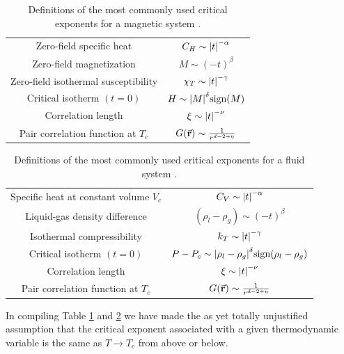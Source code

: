 \documentclass[../main/main.tex]{subfiles}
\begin{document}
\begin{table}[h!]
  \begin{center}
\begin{tabular}{cc}
\toprule
 Zero-field specific heat & \( C_H \sim \abs{t}^{-\alpha }  \) \\
 Zero-field magnetization & \( M \sim (-t)^{\beta } \) \\
 Zero-field isothermal susceptibility & \( \chi _T \sim \abs{t}^{-\gamma  }  \) \\
 Critical isotherm \( (t=0) \) & \( H \sim \abs{M}^\delta \text{sign} (M)  \)  \\
 Correlation length & \( \xi \sim \abs{t}^{- \nu }  \) \\
 Pair correlation function at \( T_c \) & \( G (\va{r}) \sim \frac{1}{r^{d-2+ \eta }} \) \\
\bottomrule
\end{tabular}
\end{center}
\caption{\label{tab:3_1} Definitions of the most commonly used critical exponents for a magnetic system \cite{3_lesson_3}.}
\end{table}

\begin{table}[h!]
  \begin{center}
\begin{tabular}{cc}
\toprule
Specific heat at constant volume \( V_c \)  & \( C_V \sim \abs{t}^{-\alpha }  \) \\
Liquid-gas density difference & \( (\rho _l - \rho _g)\sim (-t)^{\beta } \) \\
Isothermal compressibility & \( k _T \sim \abs{t}^{-\gamma  }  \) \\
 Critical isotherm \( (t=0) \) & \( P-P_c \sim \abs{\rho _l - \rho _g}^\delta \text{sign} (\rho _l - \rho _g)  \)  \\
 Correlation length & \( \xi \sim \abs{t}^{- \nu }  \) \\
 Pair correlation function at \( T_c \) & \( G (\va{r}) \sim \frac{1}{r^{d-2+ \eta }} \) \\
\bottomrule
\end{tabular}
\end{center}
\caption{ \label{tab:3_2} Definitions of the most commonly used critical exponents for a fluid system \cite{3_lesson_3}.}
\end{table}

\begin{remark}
In compiling Table \ref{tab:3_1} and \ref{tab:3_2} we have made the as yet totally unjustified assumption that the critical exponent associated with a given thermodynamic variable is the same as \( T \rightarrow T_c \) from above or below.
\end{remark}
\end{document}
